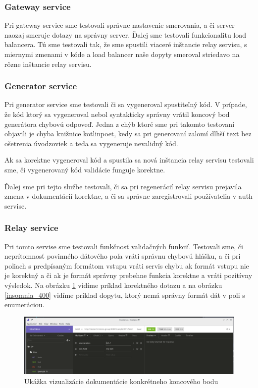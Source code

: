 \subsubsection{Gateway service}
Pri gateway service sme testovali správne nastavenie smerovania, a či server naozaj smeruje dotazy na správny server. Ďalej sme testovali funkcionalitu load balancera. Tú sme testovali tak, že sme spustili viaceré inštancie relay servisu, s miernymi zmenami v kóde a load balancer naše dopyty smeroval striedavo na rôzne inštancie relay servisu.

\subsubsection{Generator service}
Pri generator service sme testovali či sa vygeneroval spustiteľný kód. V prípade, že kód ktorý sa vygeneroval nebol syntakticky správny vrátil koncový bod generátora chybovú odpoveď. Jedna z chýb ktoré sme pri takomto testovaní objavili je chyba knižnice kotlinpoet, kedy sa pri generovaní zalomí dlhší text bez ošetrenia úvodzoviek a teda sa vygeneruje nevalidný kód.

Ak sa korektne vygeneroval kód a spustila sa nová inštancia relay servisu testovali sme, či vygenerovaný kód validácie funguje korektne.

Ďalej sme pri tejto službe testovali, či sa pri regenerácií relay servisu prejavila zmena v dokumentácií korektne, a či sa správne zaregistrovali používatelia v auth servise.

\subsubsection{Relay service}
Pri tomto servise sme testovali funkčnosť validačných funkcií. Testovali sme, či neprítomnosť povinného dátového poľa vráti správnu chybovú hlášku, a či pri poliach s predpísaným formátom vstupu vráti servis chybu ak formát vstupu nie je korektný a či ak je formát správny prebehne funkcia korektne a vráti pozitívny výsledok. Na obrázku \ref{insomnia_200} vidíme príklad korektného dotazu a na obrázku \ref{insomnia_400} vidíme príklad dopytu, ktorý nemá správny formát dát v poli s enumeráciou.

\begin{figure}[!htbp]
	\centering
	\includegraphics[width=16cm]{img/insomnia_200.png}
    \caption{Ukážka vizualizácie dokumentácie konkrétneho koncového bodu}
	\label{insomnia_200}
\end{figure}

